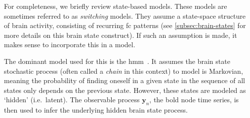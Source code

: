 For completeness, we briefly review state-based models.
These models are sometimes referred to as \emph{switching} models.
They assume a state-space structure of brain activity, consisting of recurring \gls{fc} patterns (see \cref{subsec:brain-states} for more details on this brain state construct).
If such an assumption is made, it makes sense to incorporate this in a model.

The dominant model used for this is the \gls{hmm}~\parencite[see e.g.][]{Vidaurre2017, Ahrends2022}.
It assumes the brain state stochastic process (often called a \emph{chain} in this context) to model is Markovian, meaning the probability of finding oneself in a given state in the sequence of all states only depends on the previous state.
However, these states are modeled as `hidden' (i.e.~latent).
The observable process $\mathbf{y}_n$, the \gls{bold} node time series, is then used to infer the underlying hidden brain state process.
